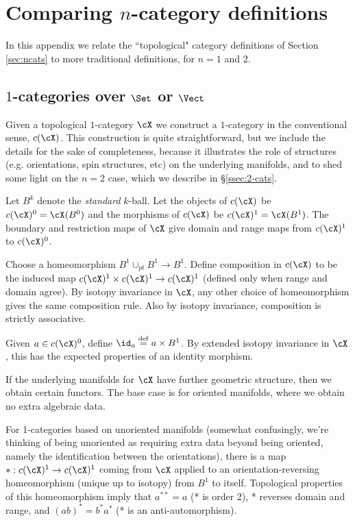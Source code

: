 
\section{Comparing $n$-category definitions}
\label{sec:comparing-defs}

In this appendix we relate the ``topological" category definitions of Section \ref{sec:ncats}
to more traditional definitions, for $n=1$ and 2.


\subsection{$1$-categories over $\Set$ or $\Vect$}
\label{ssec:1-cats}
Given a topological $1$-category $\cX$ we construct a $1$-category in the conventional sense, $c(\cX)$.
This construction is quite straightforward, but we include the details for the sake of completeness, because it illustrates the role of structures (e.g. orientations, spin structures, etc) on the underlying manifolds, and 
to shed some light on the $n=2$ case, which we describe in \S \ref{ssec:2-cats}.

Let $B^k$ denote the \emph{standard} $k$-ball.
Let the objects of $c(\cX)$ be $c(\cX)^0 = \cX(B^0)$ and the morphisms of $c(\cX)$ be $c(\cX)^1 = \cX(B^1)$. The boundary and restriction maps of $\cX$ give domain and range maps from $c(\cX)^1$ to $c(\cX)^0$.

Choose a homeomorphism $B^1\cup_{pt}B^1 \to B^1$.
Define composition in $c(\cX)$ to be the induced map $c(\cX)^1\times c(\cX)^1 \to c(\cX)^1$ (defined only when range and domain agree).
By isotopy invariance in $\cX$, any other choice of homeomorphism gives the same composition rule.
Also by isotopy invariance, composition is strictly associative.

Given $a\in c(\cX)^0$, define $\id_a \deq a\times B^1$.
By extended isotopy invariance in $\cX$, this has the expected properties of an identity morphism.


If the underlying manifolds for $\cX$ have further geometric structure, then we obtain certain functors. The base case is for oriented manifolds, where we obtain no extra algebraic data.

For 1-categories based on unoriented manifolds (somewhat confusingly, we're thinking of being unoriented as requiring extra data beyond being oriented, namely the identification between the orientations), there is a map $*:c(\cX)^1\to c(\cX)^1$
coming from $\cX$ applied to an orientation-reversing homeomorphism (unique up to isotopy) 
from $B^1$ to itself.
Topological properties of this homeomorphism imply that 
$a^{**} = a$ (* is order 2), * reverses domain and range, and $(ab)^* = b^*a^*$
(* is an anti-automorphism).

